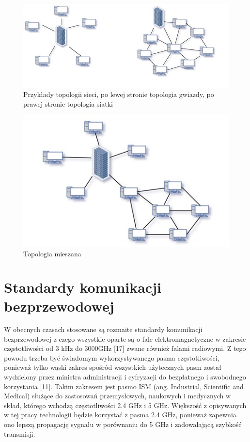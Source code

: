 \documentclass[12pt, twoside, openany]{mwrep}
\begin{document}
\begin{figure}[H]
\centering
\includegraphics[scale=1.2]{gwiazda_siatka}
\caption{Przykłady topologii sieci, po lewej stronie topologia gwiazdy, po prawej stronie topologia siatki}
\end{figure}
\hfill \break
\begin{figure}[H]
\centering
\includegraphics[scale=1.2]{mieszana}
\caption{Topologia mieszana}
\end{figure}

\section{Standardy komunikacji bezprzewodowej}

W obecnych czasach stosowane są rozmaite standardy komunikacji bezprzewodowej z czego wszystkie oparte są o fale elektromagnetyczne w zakresie częstotliwości od 3 kHz do 3000GHz [17] zwane również falami radiowymi. Z tego powodu trzeba być świadomym wykorzystywanego pasma częstotliwości, ponieważ tylko wąski zakres spośród wszystkich użytecznych pasm został wydzielony przez ministra administracji i cyfryzacji do bezpłatnego i swobodnego korzystania [11]. Takim zakresem jest pasmo ISM (ang. Industrial, Scientific and Medical) służące do zastosowań przemysłowych, naukowych i medycznych w skład, którego wchodzą częstotliwości 2.4 GHz i 5 GHz. Większość z opisywanych w tej pracy technologii będzie korzystać z pasma 2.4 GHz, ponieważ zapewnia ono lepszą propagację sygnału w porównaniu do 5 GHz i zadowalającą szybkość transmisji.
\end{document}
